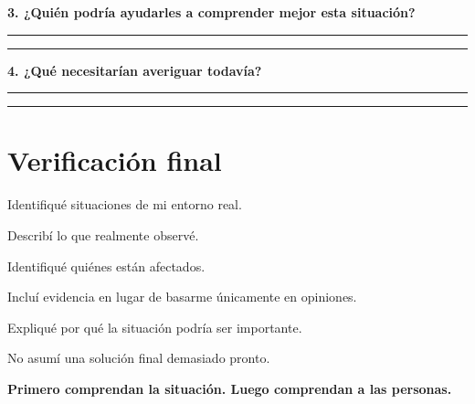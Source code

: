 \documentclass[12pt,a4paper]{article}
\newcommand{\checkbox}{\fbox{\rule{0pt}{0.8ex}\rule{0.8ex}{0pt}}}
\begin{document}
	\vspace{0.4cm}
	
	\textbf{3. ¿Quién podría ayudarles a comprender mejor esta situación?}
	
	\vspace{0.1cm}
	
	\rule{\linewidth}{0.4pt}
	
	\vspace{0.35cm}
	
	\rule{\linewidth}{0.4pt}
	
	\vspace{0.4cm}
	
	\textbf{4. ¿Qué necesitarían averiguar todavía?}
	
	\vspace{0.1cm}
	
	\rule{\linewidth}{0.4pt}
	
	\vspace{0.35cm}
	
	\rule{\linewidth}{0.4pt}
	
	\section*{Verificación final}
	
	\noindent\checkbox\quad Identifiqué situaciones de mi entorno real.
	
	\vspace{0.15cm}
	
	\noindent\checkbox\quad Describí lo que realmente observé.
	
	\vspace{0.15cm}
	
	\noindent\checkbox\quad Identifiqué quiénes están afectados.
	
	\vspace{0.15cm}
	
	\noindent\checkbox\quad Incluí evidencia en lugar de basarme únicamente en opiniones.
	
	\vspace{0.15cm}
	
	\noindent\checkbox\quad Expliqué por qué la situación podría ser importante.
	
	\vspace{0.15cm}
	
	\noindent\checkbox\quad No asumí una solución final demasiado pronto.
	
	\vspace{0.3cm}
	
	\begin{center}
		\textbf{Primero comprendan la situación. Luego comprendan a las personas.}
	\end{center}

	
\end{document}
